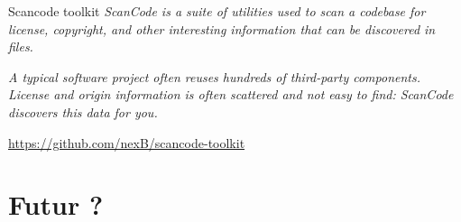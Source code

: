 \documentclass{beamer}
\begin{document}

\begin{frame}{Scancode toolkit}
\textit{ ScanCode is a suite of utilities used to scan a codebase for license, copyright, and other interesting information that can be discovered in files.}

\textit{A typical software project often reuses hundreds of third-party components. License and origin information is often scattered and not easy to find: ScanCode discovers this data for you.}

\url{https://github.com/nexB/scancode-toolkit}
\end{frame}

\begin{frame}[plain]%
%  
\end{frame}



\section{Futur ?}
\end{document}
